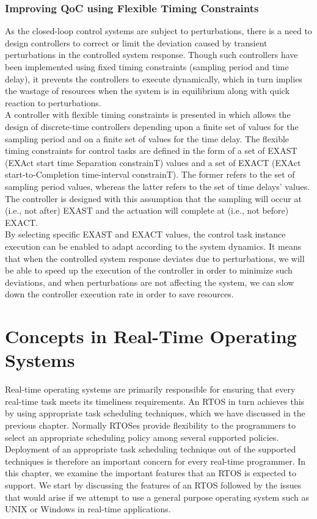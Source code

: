 \documentclass[12pt]{report}
\begin{document}
\subsection{Improving QoC using Flexible Timing Constraints}
As the closed-loop control systems are subject to perturbations, there is a need to design controllers to correct or limit the deviation caused by transient perturbations in the controlled system response. Though such controllers have been implemented using fixed timing constraints (sampling period and time delay), it prevents the controllers to execute dynamically, which in turn implies the wastage of resources when the system is in equilibrium along with quick reaction to perturbations. \\ 

A controller with flexible timing constraints is presented in \cite{qoc} which allows the design of discrete-time controllers depending upon a finite set of values for the sampling period and on a finite set of values for the time delay.  The flexible timing constraints for control tasks are defined in the form of a set of EXAST (EXAct start time Separation constrainT) values and a set of EXACT (EXAct start-to-Completion time-interval constrainT). The former refers to the set of sampling period values, whereas the latter refers to the set of time delays’ values.  The controller is designed with this assumption that the sampling will occur at (i.e., not after) EXAST and the actuation will complete at (i.e., not before) EXACT. \\

By selecting specific EXAST and EXACT values, the control task instance execution can be enabled to adapt according to the system dynamics. It means that when the controlled system response deviates due to perturbations, we will be able to speed up the execution of the controller in order to minimize such deviations, and when perturbations are not affecting the system, we can slow down the controller execution rate in order to save resources. 


\chapter{Concepts in Real-Time Operating Systems}
Real-time operating systems are primarily responsible for ensuring that every real-time task meets its timeliness requirements. An RTOS in turn achieves this by using appropriate task scheduling techniques, which we have discussed in the previous chapter. Normally RTOSes provide flexibility to the programmers to select an appropriate scheduling policy among several supported policies. Deployment of an appropriate task scheduling technique out of the supported techniques is therefore an important concern for every real-time programmer. In this chapter, we examine the important features that an RTOS is expected to support. We start by discussing the features of an RTOS followed by the issues that would arise if we attempt to use a general purpose operating system such as UNIX or Windows in real-time applications. 
\end{document}

